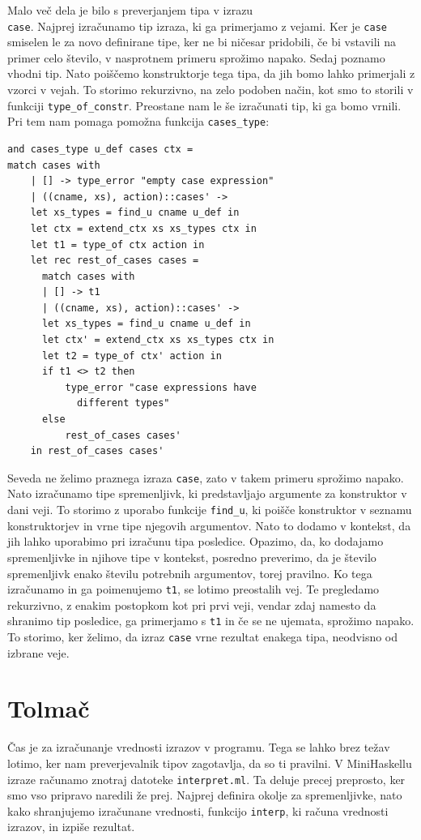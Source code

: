 \documentclass[a4paper,12pt,openright]{book}
\begin{document}
Malo več dela je bilo s preverjanjem tipa v izrazu\\ \lstinline{case}. Najprej izračunamo tip izraza, ki ga primerjamo z vejami. Ker je \lstinline{case} smiselen le za novo definirane tipe, ker ne bi ničesar 
pridobili, če bi vstavili na primer celo število, v nasprotnem primeru sprožimo napako. Sedaj poznamo vhodni tip. Nato poiščemo konstruktorje tega tipa, da jih bomo lahko primerjali z vzorci v vejah.
To storimo rekurzivno, na zelo podoben način, kot smo to storili v funkciji \lstinline{type_of_constr}. Preostane nam le še izračunati tip, ki ga bomo vrnili. Pri tem nam pomaga pomožna funkcija 
\lstinline{cases_type}:
\begin{lstlisting}
and cases_type u_def cases ctx =
match cases with
    | [] -> type_error "empty case expression"
    | ((cname, xs), action)::cases' ->
    let xs_types = find_u cname u_def in
    let ctx = extend_ctx xs xs_types ctx in
    let t1 = type_of ctx action in
    let rec rest_of_cases cases =
      match cases with
      | [] -> t1
      | ((cname, xs), action)::cases' ->
      let xs_types = find_u cname u_def in
      let ctx' = extend_ctx xs xs_types ctx in
      let t2 = type_of ctx' action in
      if t1 <> t2 then
          type_error "case expressions have 
            different types"
      else
          rest_of_cases cases'
    in rest_of_cases cases'
\end{lstlisting}
Seveda ne želimo praznega izraza \lstinline{case}, zato v takem primeru sprožimo napako. Nato izračunamo tipe spremenljivk, ki predstavljajo argumente za konstruktor v dani veji. To storimo z uporabo
funkcije \lstinline{find_u}, ki poišče konstruktor v seznamu konstruktorjev in vrne tipe njegovih argumentov. Nato to dodamo v kontekst, da jih lahko uporabimo pri izračunu tipa posledice. Opazimo, 
da, ko dodajamo spremenljivke in njihove tipe v kontekst, posredno preverimo, da je število spremenljivk enako številu potrebnih argumentov, torej pravilno. Ko tega izračunamo in ga 
poimenujemo \lstinline{t1}, se lotimo preostalih vej. Te pregledamo rekurzivno, z enakim postopkom kot pri prvi veji, vendar zdaj namesto da shranimo tip posledice, ga primerjamo s \lstinline{t1} in če 
se ne ujemata, sprožimo napako. To storimo, ker želimo, da izraz \lstinline{case} vrne rezultat enakega tipa, neodvisno od izbrane veje.

\section{Tolmač}
Čas je za izračunanje vrednosti izrazov v programu. Tega se lahko brez težav lotimo, ker nam preverjevalnik tipov zagotavlja, da so ti pravilni. V MiniHaskellu izraze računamo znotraj datoteke 
\lstinline{interpret.ml}. Ta deluje precej preprosto, ker smo vso pripravo naredili že prej. Najprej definira okolje za spremenljivke, nato kako shranjujemo izračunane vrednosti, funkcijo 
\lstinline{interp}, ki računa vrednosti izrazov, in izpiše rezultat. 
\end{document}
